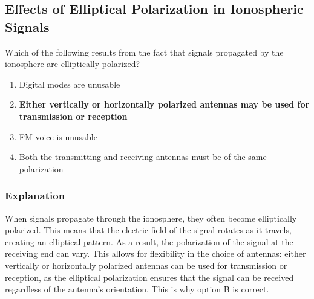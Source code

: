 \subsection{Effects of Elliptical Polarization in Ionospheric Signals}
\label{T3A09}

\begin{tcolorbox}[colback=gray!10!white,colframe=black!75!black,title=T3A09]
Which of the following results from the fact that signals propagated by the ionosphere are elliptically polarized?
\begin{enumerate}[noitemsep]
    \item Digital modes are unusable
    \item \textbf{Either vertically or horizontally polarized antennas may be used for transmission or reception}
    \item FM voice is unusable
    \item Both the transmitting and receiving antennas must be of the same polarization
\end{enumerate}
\end{tcolorbox}

\subsubsection*{Explanation}
When signals propagate through the ionosphere, they often become elliptically polarized. This means that the electric field of the signal rotates as it travels, creating an elliptical pattern. As a result, the polarization of the signal at the receiving end can vary. This allows for flexibility in the choice of antennas: either vertically or horizontally polarized antennas can be used for transmission or reception, as the elliptical polarization ensures that the signal can be received regardless of the antenna's orientation. This is why option B is correct.